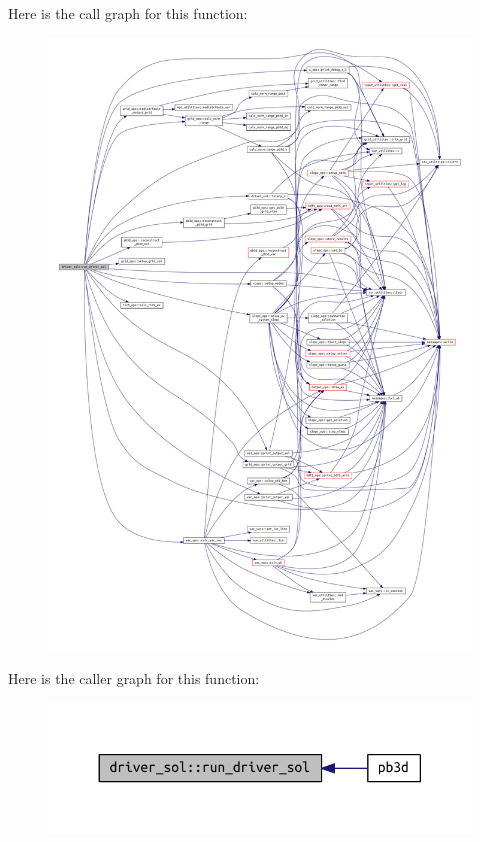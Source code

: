 Here is the call graph for this function\+:
\nopagebreak
\begin{figure}[H]
\begin{center}
\leavevmode
\includegraphics[width=350pt]{namespacedriver__sol_ad3b1765b3ecc5f82129bfc683ffc6c5c_cgraph}
\end{center}
\end{figure}
Here is the caller graph for this function\+:
\nopagebreak
\begin{figure}[H]
\begin{center}
\leavevmode
\includegraphics[width=330pt]{namespacedriver__sol_ad3b1765b3ecc5f82129bfc683ffc6c5c_icgraph}
\end{center}
\end{figure}
